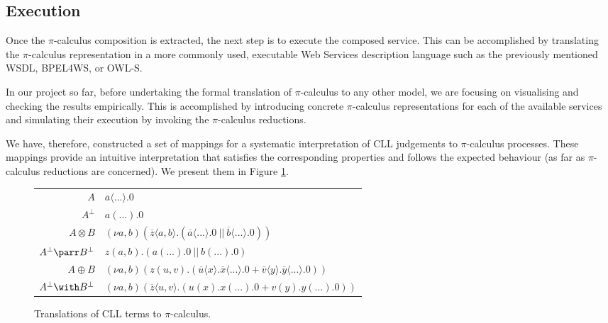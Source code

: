 \documentclass[copyright,creativecommons]{eptcs}
\begin{document}
\subsection{Execution}
\label{execution}

Once the $\pi$-calculus composition is extracted, the next step is to execute the composed service. This can be accomplished by translating the $\pi$-calculus representation in a more commonly used, executable Web Services description language such as the previously mentioned WSDL, BPEL4WS, or OWL-S. 

In our project so far, before undertaking the formal translation of $\pi$-calculus to any other model, we are focusing on visualising and checking the results empirically. This is accomplished by introducing concrete $\pi$-calculus representations for each of the available services and simulating their execution by invoking the $\pi$-calculus reductions.

We have, therefore, constructed a set of mappings for a systematic interpretation of CLL judgements to $\pi$-calculus processes. These mappings provide an intuitive interpretation that satisfies the corresponding properties and follows the expected behaviour (as far as $\pi$-calculus reductions are concerned). We present them in Figure \ref{proctrans}.

\begin{figure}[htbp]
	\centering
		\begin{tabular}{rl}
			$A$ & $\overline{a}\langle ...\rangle .0$ \\
			$A^\bot$ & $a(...).0$ \\
			$A \otimes B$ & $(\nu a,b)(\overline{z}\langle a,b \rangle.(\overline{a}\langle ...\rangle.0\ ||\ \overline{b}\langle ...\rangle .0))$ \\
			$A^\bot \parr B^\bot$ & $z(a,b).(a(...).0\ ||\ b(...).0)$\\
			$A \oplus B$ & $(\nu a,b) (z(u,v).(\overline{u}\langle x \rangle.\overline{x}\langle ... \rangle.0 + \overline{v}\langle y \rangle.\overline{y}\langle ... \rangle.0))$ \\
			$A^\bot \with B^\bot$ & $(\nu a,b) (\overline{z}\langle u,v \rangle.(u(x).x(...).0 + v(y).y(...).0))$\\
		\end{tabular}
			\caption{Translations of CLL terms to $\pi$-calculus.}
			\label{proctrans}
\end{figure}
\end{document}
